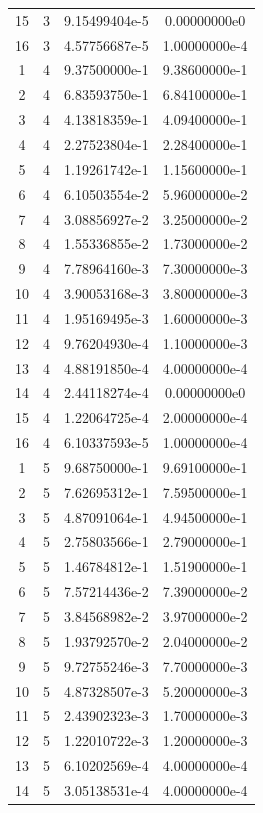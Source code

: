 \begin{table}[h]
\begin{tabular}{|c|c|c|c|}
15 & 3 & 9.15499404e-5 & 0.00000000e0 \\
16 & 3 & 4.57756687e-5 & 1.00000000e-4 \\
1 & 4 & 9.37500000e-1 & 9.38600000e-1 \\
2 & 4 & 6.83593750e-1 & 6.84100000e-1 \\
3 & 4 & 4.13818359e-1 & 4.09400000e-1 \\
4 & 4 & 2.27523804e-1 & 2.28400000e-1 \\
5 & 4 & 1.19261742e-1 & 1.15600000e-1 \\
6 & 4 & 6.10503554e-2 & 5.96000000e-2 \\
7 & 4 & 3.08856927e-2 & 3.25000000e-2 \\
8 & 4 & 1.55336855e-2 & 1.73000000e-2 \\
9 & 4 & 7.78964160e-3 & 7.30000000e-3 \\
10 & 4 & 3.90053168e-3 & 3.80000000e-3 \\
11 & 4 & 1.95169495e-3 & 1.60000000e-3 \\
12 & 4 & 9.76204930e-4 & 1.10000000e-3 \\
13 & 4 & 4.88191850e-4 & 4.00000000e-4 \\
14 & 4 & 2.44118274e-4 & 0.00000000e0 \\
15 & 4 & 1.22064725e-4 & 2.00000000e-4 \\
16 & 4 & 6.10337593e-5 & 1.00000000e-4 \\
1 & 5 & 9.68750000e-1 & 9.69100000e-1 \\
2 & 5 & 7.62695312e-1 & 7.59500000e-1 \\
3 & 5 & 4.87091064e-1 & 4.94500000e-1 \\
4 & 5 & 2.75803566e-1 & 2.79000000e-1 \\
5 & 5 & 1.46784812e-1 & 1.51900000e-1 \\
6 & 5 & 7.57214436e-2 & 7.39000000e-2 \\
7 & 5 & 3.84568982e-2 & 3.97000000e-2 \\
8 & 5 & 1.93792570e-2 & 2.04000000e-2 \\
9 & 5 & 9.72755246e-3 & 7.70000000e-3 \\
10 & 5 & 4.87328507e-3 & 5.20000000e-3 \\
11 & 5 & 2.43902323e-3 & 1.70000000e-3 \\
12 & 5 & 1.22010722e-3 & 1.20000000e-3 \\
13 & 5 & 6.10202569e-4 & 4.00000000e-4 \\
14 & 5 & 3.05138531e-4 & 4.00000000e-4 \\

\end{tabular}
\end{table}
